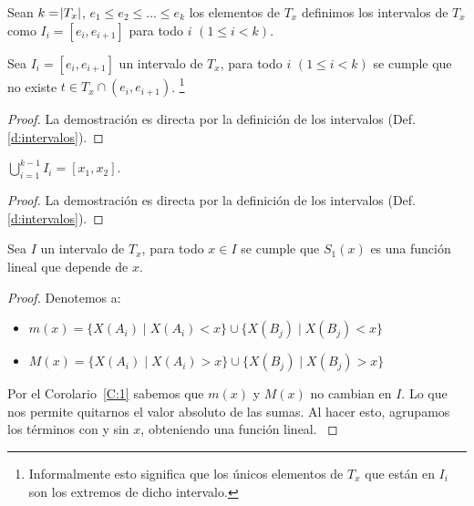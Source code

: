 \begin{definition}
    Sean $k = \abs{T_x}$, $e_1 \le e_2 \le \ldots \le e_k$ los elementos de $T_x$ definimos los intervalos de $T_x$ como $I_{i} = [ e_i, e_{i+1}]$ para todo $i$ $(1 \le i < k)$.
    \label{d:intervalos}
\end{definition}

\begin{collorary}
    Sea $I_i = [e_i, e_{i+1}]$ un intervalo de $T_x$, para todo $i$ $(1 \le i < k)$ se cumple que no existe $t \in T_x \cap (e_i, e_{i+1})$. \footnote{Informalmente esto significa que los únicos elementos de $T_x$ que están en $I_i$ son los extremos de dicho intervalo.}
    \label{C:1}
\end{collorary}

\begin{proof}
    La demostración es directa por la definición de los intervalos (Def. \ref{d:intervalos}).
\end{proof}

\begin{collorary}
    $\displaystyle \bigcup_{i=1}^{k-1} I_i = [x_1, x_2]$.
    \label{C:2}
\end{collorary}

\begin{proof}
    La demostración es directa por la definición de los intervalos (Def. \ref{d:intervalos}).
\end{proof}

\begin{proposition}
    Sea $I$ un intervalo de $T_x$, para todo $x \in I$ se cumple que $S_1(x)$ es una función lineal que depende de $x$.
    \label{def_fnok}
\end{proposition} 

\begin{proof}
    \hfill

    Denotemos a:

    \begin{itemize}[label=\textbullet]
        \item $m(x) = \{ X(A_i) \mid X(A_i) < x \} \cup \{ X(B_j) \mid X(B_j) < x \}$
        \item $M(x) = \{ X(A_i) \mid X(A_i) > x \} \cup \{ X(B_j) \mid X(B_j) > x \}$
    \end{itemize}

    Por el Corolario~\ref{C:1} sabemos que $m(x)$ y $M(x)$ no cambian en $I$. Lo que nos permite quitarnos el valor absoluto de las sumas. Al hacer esto, agrupamos los términos con y sin $x$, obteniendo una función lineal.
    \label{P:linear}
\end{proof}

